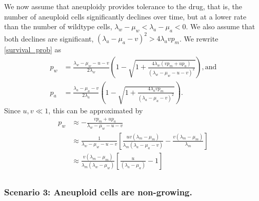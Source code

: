 \documentclass[12pt]{extarticle}
\begin{document}
We now assume that aneuploidy provides tolerance to the drug, that is, the number of aneuploid cells significantly declines over time, but at a lower rate than the number of wildtype cells, $\lambda_w - \mu_w < \lambda_a - \mu_a < 0$. We also assume that both declines are significant, $\left(\lambda_a-\mu_a-v\right)^2 > 4\lambda_a v p_m$.
We rewrite \cref{survival_prob} as
\begin{align*}
p_w&=\frac{\lambda_w-\mu_w-u-v}{2\lambda_w}\left(1-\sqrt{1+\frac{4\lambda_w\left(vp_m+up_a\right)}{\left(\lambda_w-\mu_w-u-v\right)^2}}\right) ,
\text{and} \\
p_a&=\frac{\lambda_a-\mu_a-v}{2\lambda_a}\left(1-\sqrt{1+\frac{4\lambda_avp_m}{\left(\lambda_a-\mu_a-v\right)^2}}\right) .
\end{align*}
Since $u,v\ll1$, this can be approximated by %
\begin{equation}\label{survprobwinitial}
\begin{aligned}
p_w&\approx-\frac{vp_m+up_a}{\lambda_w-\mu_w-u-v}\\
&\approx\frac{1}{\lambda_w-\mu_w-u-v}\left[\frac{uv\left(\lambda_m-\mu_m\right)}{\lambda_m\left(\lambda_a-\mu_a-v\right)}-\frac{v\left(\lambda_m-\mu_m\right)}{\lambda_m}\right]\\ %
&\approx\frac{v\left(\lambda_m-\mu_m\right)}{\lambda_m\left(\lambda_w-\mu_w\right)}\left[\frac{u}{\left(\lambda_a-\mu_a\right)}-1\right]\\
\end{aligned}
\end{equation}

\subsubsection*{Scenario 3: Aneuploid cells are non-growing.}
\end{document}
